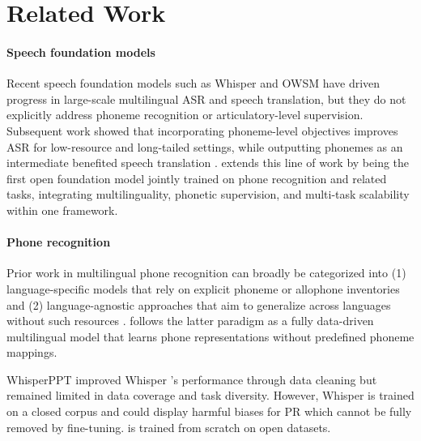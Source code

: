 \section{Related Work}


\paragraph{Speech foundation models}
Recent speech foundation models such as Whisper \citep{radford2023robust} and OWSM \citep{peng2023reproducing,peng24b_interspeech} have driven progress in large-scale multilingual ASR and speech translation, but they do not explicitly address phoneme recognition or articulatory-level supervision. 
Subsequent work \citep{yusuyin2025whistle,fu2025pac} showed that incorporating phoneme-level objectives improves ASR for low-resource and long-tailed settings, while outputting phonemes as an intermediate benefited speech translation \citep{gállego2025speechtotexttranslationphonemeaugmentedcot}.
\POWSM extends this line of work by being the first open foundation model jointly trained on phone recognition and related tasks, integrating multilinguality, phonetic supervision, and multi-task scalability within one framework.


\paragraph{Phone recognition}
Prior work in multilingual phone recognition can broadly be categorized into (1) language-specific models \citep{gao21_interspeech} that rely on explicit phoneme \citep{xu22b_interspeech} or allophone inventories \citep{li2020universal} and (2) language-agnostic approaches that aim to generalize across languages without such resources \citep{taguchi23_interspeech,glocker23_interspeech,li2021hierarchical,zhu-etal-2025-zipa}. 
\POWSM follows the latter paradigm as a fully data-driven multilingual model that learns phone representations without predefined phoneme mappings.

WhisperPPT \citep{samir2024efficiently} improved Whisper \citep{radford2023robust}'s performance through data cleaning but remained limited in data coverage and task diversity.
However, Whisper is trained on a closed corpus and could display harmful biases for PR which cannot be fully removed by fine-tuning.
\POWSM is trained from scratch on open datasets.

